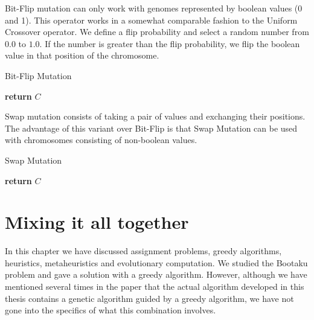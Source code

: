 Bit-Flip mutation can only work with genomes represented by boolean values (0 and 1). This operator works in a somewhat comparable fashion to the Uniform Crossover operator. We define a flip probability and select a random number from $0.0$ to $1.0$. If the number is greater than the flip probability, we flip the boolean value in that position of the chromosome.

\begin{algorithm}[H]
    \caption{Bit-Flip Mutation}
    \begin{algorithmic}[1]
                \EndIf
            \EndFor
            \State \textbf{return} $C$
        \EndProcedure
    \end{algorithmic}
\end{algorithm}

Swap mutation consists of taking a pair of values and exchanging their positions. The advantage of this variant over Bit-Flip is that Swap Mutation can be used with chromosomes consisting of non-boolean values. 

\begin{algorithm}[H]
    \caption{Swap Mutation}
    \begin{algorithmic}[1]
            \EndWhile
            \State \textbf{return} $C$
        \EndProcedure
    \end{algorithmic}
\end{algorithm}



\section{Mixing it all together}

In this chapter we have discussed assignment problems, greedy algorithms, heuristics, metaheuristics and evolutionary computation. We studied the Bootaku problem and gave a solution with a greedy algorithm. However, although we have mentioned several times in the paper that the actual algorithm developed in this thesis contains a genetic algorithm guided by a greedy algorithm, we have not gone into the specifics of what this combination involves.

